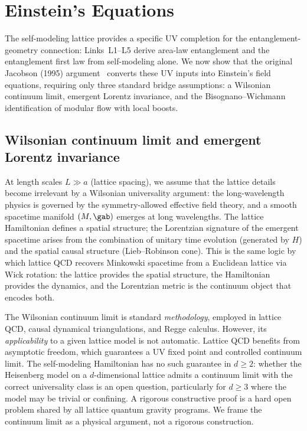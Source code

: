 \section{Einstein's Equations}
\label{sec:einstein}

The self-modeling lattice provides a specific UV completion for the
entanglement-geometry connection: Links~L1--L5 derive area-law
entanglement and the entanglement first law from self-modeling alone.
We now show that the original Jacobson (1995)
argument~\cite{Jacobson1995} converts these UV inputs into Einstein's
field equations, requiring only three standard bridge assumptions:
a Wilsonian continuum limit, emergent Lorentz invariance, and the
Bisognano--Wichmann identification of modular flow with local boosts.

\subsection{Wilsonian continuum limit and emergent Lorentz invariance}
\label{sec:continuum}

At length scales $L \gg a$ (lattice spacing), we assume that the
lattice details become irrelevant by a Wilsonian universality
argument: the long-wavelength physics is governed by the
symmetry-allowed effective field theory, and a smooth spacetime
manifold $(M, \gab)$ emerges at long wavelengths.  The lattice
Hamiltonian defines a spatial structure; the Lorentzian signature of
the emergent spacetime arises from the combination of unitary time
evolution (generated by $H$) and the spatial causal structure
(Lieb--Robinson cone).  This is the same logic by which lattice QCD
recovers Minkowski spacetime from a Euclidean lattice via Wick
rotation: the lattice provides the spatial structure, the Hamiltonian
provides the dynamics, and the Lorentzian metric is the continuum
object that encodes both.

The Wilsonian continuum limit is standard \emph{methodology}, employed
in lattice QCD, causal dynamical triangulations, and Regge calculus.
However, its \emph{applicability} to a given lattice model is not
automatic.  Lattice QCD benefits from asymptotic freedom, which
guarantees a UV fixed point and controlled continuum limit.  The
self-modeling Hamiltonian has no such guarantee in $d \geq 2$: whether
the Heisenberg model on a $d$-dimensional lattice admits a continuum
limit with the correct universality class is an open question,
particularly for $d \geq 3$ where the model may be trivial or
confining.  A rigorous constructive proof is a hard open problem shared
by all lattice quantum gravity programs.  We frame the continuum limit
as a physical argument, not a rigorous construction.

